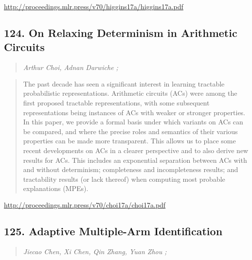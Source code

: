 \documentclass{article}
\begin{document}
\href{http://proceedings.mlr.press/v70/higgins17a/higgins17a.pdf}{http://proceedings.mlr.press/v70/higgins17a/higgins17a.pdf}

\subsection{124. On Relaxing Determinism in Arithmetic Circuits}

\begin{quote}
\footnotesize{\textit{Arthur Choi, Adnan Darwiche ;}}
\end{quote}

\begin{quote}
    The past decade has seen a significant interest in learning tractable probabilistic representations. Arithmetic circuits (ACs) were among the first proposed tractable representations, with some subsequent representations being instances of ACs with weaker or stronger properties. In this paper, we provide a formal basis under which variants on ACs can be compared, and where the precise roles and semantics of their various properties can be made more transparent. This allows us to place some recent developments on ACs in a clearer perspective and to also derive new results for ACs. This includes an exponential separation between ACs with and without determinism; completeness and incompleteness results; and tractability results (or lack thereof) when computing most probable explanations (MPEs).  \end{quote}

\href{http://proceedings.mlr.press/v70/choi17a/choi17a.pdf}{http://proceedings.mlr.press/v70/choi17a/choi17a.pdf}

\subsection{125. Adaptive Multiple-Arm Identification}

\begin{quote}
\footnotesize{\textit{Jiecao Chen, Xi Chen, Qin Zhang, Yuan Zhou ;}}
\end{quote}
\end{document}
